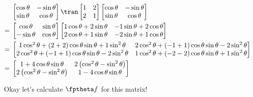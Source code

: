 \begin{equation*}
  \begin{split}
      &\begin{bmatrix}
        \cos\theta & -\sin\theta \\
        \sin\theta & \cos\theta
      \end{bmatrix}\tran
      \begin{bmatrix}
        1 & 2 \\
        2 & 1
      \end{bmatrix}
      \begin{bmatrix}
        \cos\theta & -\sin\theta \\
        \sin\theta & \cos\theta
      \end{bmatrix}
    \\
    ={}&
      \begin{bmatrix}
        \cos\theta  & \sin\theta \\
        -\sin\theta & \cos\theta
      \end{bmatrix}
      \begin{bmatrix}
        1\cos\theta + 2\sin\theta & -1\sin\theta + 2\cos\theta \\
        2\cos\theta + 1\sin\theta & -2\sin\theta + 1\cos\theta
      \end{bmatrix}
    \\
    ={}&
      \begin{bmatrix}
        1 \cos^2\theta + (2 + 2) \cos\theta \sin\theta + 1 \sin^2\theta
        &
        2 \cos^2\theta + (-1 + 1) \cos\theta \sin\theta - 2\sin^2\theta
        \\
        2 \cos^2\theta + (-1 + 1) \cos\theta \sin\theta - 2\sin^2\theta
        &
        1\cos^2\theta + (-2 - 2) \cos\theta\sin\theta + 1\sin^2\theta
      \end{bmatrix}
    \\
    ={}&
      \begin{bmatrix}
        1 + 4\cos\theta\sin\theta
        &
        2 \left( \cos^2\theta - \sin^2\theta \right)
        \\
        2 \left( \cos^2\theta - \sin^2\theta \right)
        &
        1 - 4\cos\theta\sin\theta
      \end{bmatrix}
    \end{split}
\end{equation*}

Okay let's calculate $\fptheta f$ for this matrix!

